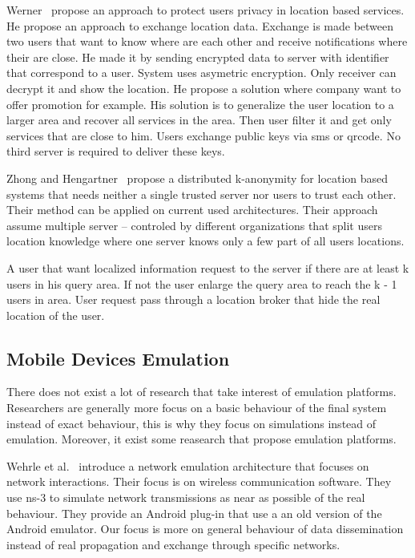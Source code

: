 Werner~\cite{DBLP:conf/mobisec/Werner10} propose an approach to protect users privacy in location based services.
He propose an approach to exchange location data.
Exchange is made between two users that want to know where are each other and receive notifications where their are close.
He made it by sending encrypted data to server with identifier that correspond to a user.
System uses asymetric encryption.
Only receiver can decrypt it and show the location.
He propose a solution where company want to offer promotion for example.
His solution is to generalize the user location to a larger area and recover all services in the area.
Then user filter it and get only services that are close to him.
Users exchange public keys via sms or qrcode.
No third server is required to deliver these keys.

Zhong and Hengartner~\cite{DBLP:conf/percom/ZhongH09} propose a distributed k-anonymity for location based systems that needs neither a single trusted server nor users to trust each other.
Their method can be applied on current used architectures.
Their approach assume multiple server -- controled by different organizations that split users location knowledge where one server knows only a few part of all users locations.

A user that want localized information request to the server if there are at least k users in his query area. If not the user enlarge the query area to reach the k - 1 users in area.
User request pass through a location broker that hide the real location of the user.


\subsection{Mobile Devices Emulation}


There does not exist a lot of research that take interest of emulation platforms.
Researchers are generally more focus on a basic behaviour of the final system instead of exact behaviour, this is why they focus on simulations instead of emulation.
Moreover, it exist some reasearch that propose emulation platforms.

Wehrle et al.~\cite{DBLP:conf/simutools/WeingartnerLW11} introduce a network emulation architecture that focuses on network interactions.
Their focus is on wireless communication software.
They use ns-3 to simulate network transmissions as near as possible of the real behaviour.
They provide an Android plug-in that use a an old version of the Android emulator.
Our focus is more on general behaviour of data dissemination instead of real propagation and exchange through specific networks.

